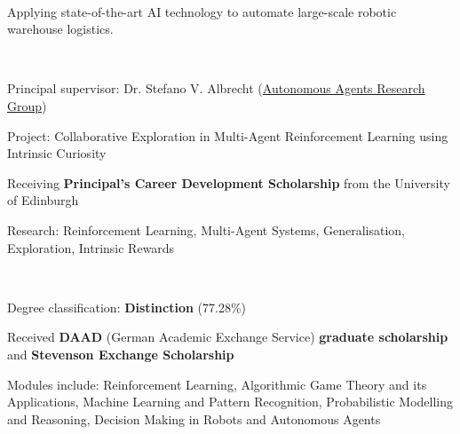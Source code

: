 \documentclass[]{lukas-cv-openfont}
\begin{document}


\vspace{1em}


\noindent
{}
\\
\begin{tightitemize}{1.7em}
    \item Applying state-of-the-art AI technology to automate large-scale robotic warehouse logistics.
\end{tightitemize}
\largesectionsep



\noindent
{}
\\
\begin{tightitemize}{1.7em}
    \item Principal supervisor: Dr. Stefano V. Albrecht (\href{https://agents.inf.ed.ac.uk}{Autonomous Agents Research Group})
    \item Project: Collaborative Exploration in Multi-Agent Reinforcement Learning using Intrinsic Curiosity
    \item Receiving \textbf{Principal's Career Development Scholarship} from the University of Edinburgh
    \item Research: Reinforcement Learning, Multi-Agent Systems, Generalisation, Exploration, Intrinsic Rewards
\end{tightitemize}
\largesectionsep

\noindent
{}
\\
\begin{tightitemize}{1.7em}
    \item Degree classification: \textbf{Distinction} (77.28\%)
    \item Received \textbf{DAAD} (German Academic Exchange Service) \textbf{graduate scholarship} and \textbf{Stevenson Exchange Scholarship} 
    \item Modules include: Reinforcement Learning, Algorithmic Game Theory and its Applications, Machine Learning and 
    Pattern Recognition, Probabilistic Modelling and Reasoning, Decision Making in Robots and Autonomous Agents
\end{tightitemize}
\largesectionsep
\end{document}
